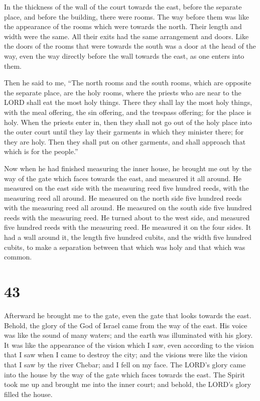  In the thickness of the wall of the court towards the
east, before the separate place, and before the building, there were
rooms.  The way before them was like the appearance of the
rooms which were towards the north. Their length and width were the
same. All their exits had the same arrangement and doors. 
Like the doors of the rooms that were towards the south was a door at
the head of the way, even the way directly before the wall towards the
east, as one enters into them.

 Then he said to me, ``The north rooms and the south rooms,
which are opposite the separate place, are the holy rooms, where the
priests who are near to the LORD shall eat the most holy things. There
they shall lay the most holy things, with the meal offering, the sin
offering, and the trespass offering; for the place is holy.
 When the priests enter in, then they shall not go out of
the holy place into the outer court until they lay their garments in
which they minister there; for they are holy. Then they shall put on
other garments, and shall approach that which is for the people.''

 Now when he had finished measuring the inner house, he
brought me out by the way of the gate which faces towards the east, and
measured it all around.  He measured on the east side with
the measuring reed five hundred reeds, with the measuring reed all
around.  He measured on the north side five hundred reeds
with the measuring reed all around.  He measured on the
south side five hundred reeds with the measuring reed.  He
turned about to the west side, and measured five hundred reeds with the
measuring reed.  He measured it on the four sides. It had a
wall around it, the length five hundred cubits, and the width five
hundred cubits, to make a separation between that which was holy and
that which was common.

\hypertarget{section-41}{%
\section{43}\label{section-41}}

 Afterward he brought me to the gate, even the gate that
looks towards the east.  Behold, the glory of the God of
Israel came from the way of the east. His voice was like the sound of
many waters; and the earth was illuminated with his glory. 
It was like the appearance of the vision which I saw, even according to
the vision that I saw when I came to destroy the city; and the visions
were like the vision that I saw by the river Chebar; and I fell on my
face.  The LORD's glory came into the house by the way of
the gate which faces towards the east.  The Spirit took me
up and brought me into the inner court; and behold, the LORD's glory
filled the house.

